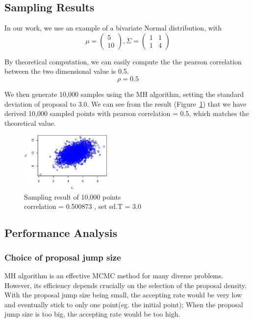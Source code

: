 \subsection{Sampling Results}
In our work, we use an example of a bivariate Normal distribution, with
$$ \mu = \left( \begin{array}{ccc}
5 \\
10 \end{array} \right), 
\Sigma = \left( \begin{array}{ccc}
1 & 1\\
1 & 4\end{array} \right)$$

By theoretical computation, we can easily compute the the pearson correlation between the two dimensional value is 0.5.
$$ \rho = 0.5 $$

We then generate 10,000 samples using the MH algorithm, setting the standard deviation of proposal to 3.0. We can see from the result (Figure~\ref{fig:sample_result}) that we have derived 10,000 sampled points with pearson correlation = 0.5, which matches the theoretical value.

\begin{figure}[tb]
  	\centering
  	\includegraphics[width=0.4\textwidth]{figure/sample_result.eps}
	\caption{Sampling result of 10,000 points \protect\\ correlation = 0.500873 , set sd.T = 3.0}
	\label{fig:sample_result}
\end{figure}


\subsection{Performance Analysis}

\subsubsection{Choice of proposal jump size}
MH algorithm is an effective MCMC method for many diverse problems. However, its efficiency depends crucially on the selection of the proposal density. With the proposal jump size being small, the accepting rate would be very low and eventually stick to only one point(eg. the initial point); When the proposal jump size is too big, the accepting rate would be too high. 

